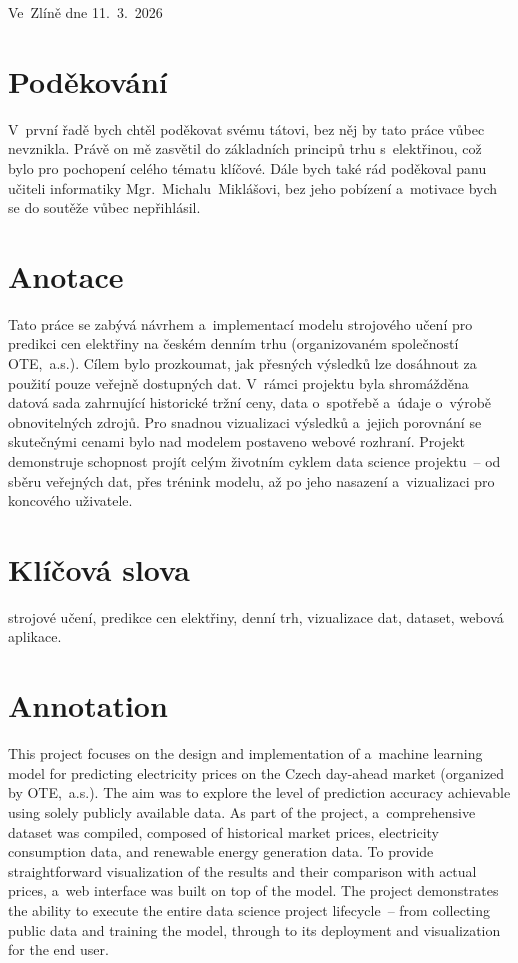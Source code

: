 \documentclass[a4paper]{article}
\begin{document}
\noindent Ve~Zlíně dne 11.~3.~2026~
\newpage

\section*{Poděkování}
V~první řadě bych chtěl poděkovat svému tátovi, bez něj by tato práce vůbec nevznikla. Právě on mě zasvětil do základních principů trhu s~elektřinou, což bylo pro pochopení celého tématu klíčové. Dále bych také rád poděkoval panu učiteli informatiky Mgr.~Michalu~Miklášovi, bez jeho pobízení a~motivace bych se do soutěže vůbec nepřihlásil. 
\newpage

\section*{Anotace}
Tato práce se zabývá návrhem a~implementací modelu strojového učení pro predikci cen elektřiny na českém denním trhu (organizovaném společností OTE,~a.s.). Cílem bylo prozkoumat, jak přesných výsledků lze dosáhnout za použití pouze veřejně dostupných dat. V~rámci projektu byla shromážděna datová sada zahrnující historické tržní ceny, data o~spotřebě a~údaje o~výrobě obnovitelných zdrojů. Pro snadnou vizualizaci výsledků a~jejich porovnání se skutečnými cenami bylo nad modelem postaveno webové rozhraní. Projekt demonstruje schopnost projít celým životním cyklem data science projektu~-- od sběru veřejných dat, přes trénink modelu, až po jeho nasazení a~vizualizaci pro koncového uživatele.

\section*{Klíčová slova}
strojové učení, predikce cen elektřiny, denní trh, vizualizace dat, dataset, webová aplikace.

\section*{Annotation}
This project focuses on the design and implementation of a~machine learning model for predicting electricity prices on the Czech day-ahead market (organized by OTE,~a.s.). The aim was to explore the level of prediction accuracy achievable using solely publicly available data. As part of the project, a~comprehensive dataset was compiled, composed of historical market prices, electricity consumption data, and renewable energy generation data. To provide straightforward visualization of the results and their comparison with actual prices, a~web interface was built on top of the model. The project demonstrates the ability to execute the entire data science project lifecycle~-- from collecting public data and training the model, through to its deployment and visualization for the end user.
\end{document}
